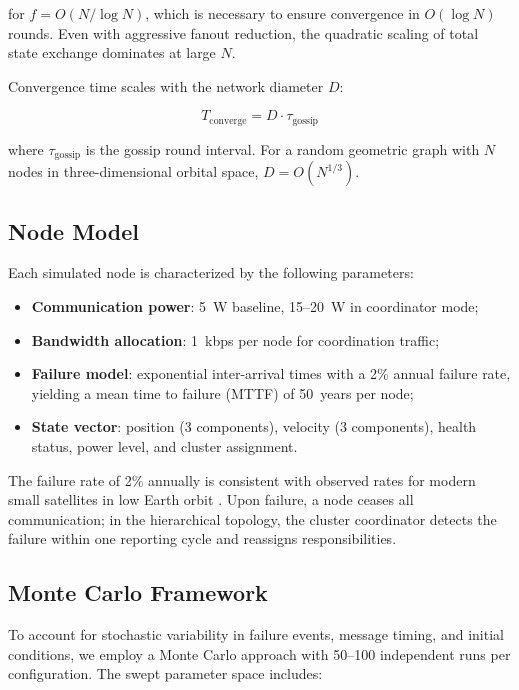 \documentclass[journal]{IEEEtran}
\begin{document}
\noindent for $f = O(N / \log N)$, which is necessary to ensure convergence in $O(\log N)$ rounds. Even with aggressive fanout reduction, the quadratic scaling of total state exchange dominates at large $N$.

Convergence time scales with the network diameter $D$:

\begin{equation}
    T_{\text{converge}} = D \cdot \tau_{\text{gossip}}
    \label{eq:mesh_convergence}
\end{equation}

\noindent where $\tau_{\text{gossip}}$ is the gossip round interval. For a random geometric graph with $N$ nodes in three-dimensional orbital space, $D = O(N^{1/3})$.

\subsection{Node Model}

Each simulated node is characterized by the following parameters:

\begin{itemize}
    \item \textbf{Communication power}: 5~W baseline, 15--20~W in coordinator mode;
    \item \textbf{Bandwidth allocation}: 1~kbps per node for coordination traffic;
    \item \textbf{Failure model}: exponential inter-arrival times with a 2\% annual failure rate, yielding a mean time to failure (MTTF) of 50~years per node;
    \item \textbf{State vector}: position (3 components), velocity (3 components), health status, power level, and cluster assignment.
\end{itemize}

The failure rate of 2\% annually is consistent with observed rates for modern small satellites in low Earth orbit \cite{castet_smallsat_reliability}. Upon failure, a node ceases all communication; in the hierarchical topology, the cluster coordinator detects the failure within one reporting cycle and reassigns responsibilities.

\subsection{Monte Carlo Framework}

To account for stochastic variability in failure events, message timing, and initial conditions, we employ a Monte Carlo approach with 50--100 independent runs per configuration. The swept parameter space includes:
\end{document}
